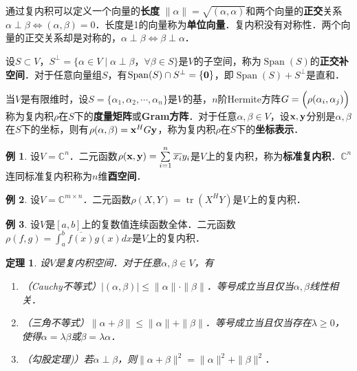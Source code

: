 \documentclass[a4paper,fontset=windows]{ctexbook}
\newtheorem{theorem}{定理}[chapter]
\theoremstyle{definition}
\newtheorem{example}{例}[chapter]
\DeclareMathOperator{\Span}{Span}
\DeclareMathOperator{\tr}{tr}
\renewcommand{\le}{\leqslant}
\renewcommand{\ge}{\geqslant}
\begin{document}
通过复内积可以定义一个向量的{\bf 长度} $\|\alpha\|=\sqrt{(\alpha,\alpha)}$和两个向量的{\bf 正交}关系$\alpha\perp\beta\Leftrightarrow(\alpha,\beta)=0$．长度是1的向量称为{\bf 单位向量}．复内积没有对称性．两个向量的正交关系却是对称的，$\alpha\perp\beta\Leftrightarrow\beta\perp\alpha$．

设$S\subset V$，$S^\perp=\{\alpha\in V\mid\alpha\perp\beta$，$\forall\beta\in S\}$是$V$的子空间，称为$\Span(S)$的{\bf 正交补空间}．对于任意向量组$S$，有$\Span(S)\cap S^\perp=\{{\bf 0}\}$，即$\Span(S)+S^\perp$是直和．

当$V$是有限维时，设$S=\{\alpha_1,\alpha_2,\cdots,\alpha_n\}$是$V$的基，$n$阶Hermite方阵$G=\Bigl(\rho(\alpha_i,\alpha_j)\Bigr)$称为复内积$\rho$在$S$下的{\bf 度量矩阵}或{\bf Gram方阵}．对于任意$\alpha,\beta\in V$，设${\bf x,y}$分别是$\alpha,\beta$在$S$下的坐标，则有$\rho(\alpha,\beta)={\bf x}^HG{\bf y}$，称为复内积$\rho$在$S$下的{\bf 坐标表示}．

\begin{example}
设$V=\mathbb{C}^n$．二元函数$\rho({\bf x,y})=\sum\limits_{i=1}^n\overline{x_i}y_i$是$V$上的复内积，称为{\bf 标准复内积}．$\mathbb{C}^n$连同标准复内积称为$n$维{\bf 酉空间}．
\end{example}

\begin{example}
设$V=\mathbb{C}^{m\times n}$．二元函数$\rho(X,Y)=\tr(X^HY)$是$V$上的复内积．
\end{example}

\begin{example}
设$V$是$[a,b]$上的复数值连续函数全体．二元函数$\rho(f,g)=\int_a^b\overline{f(x)}g(x)dx$是$V$上的复内积．
\end{example}

\begin{theorem}
设$V$是复内积空间．对于任意$\alpha,\beta\in V$，有
\begin{enumerate}
\item（{\rm Cauchy不等式}）$|(\alpha,\beta)|\le\|\alpha\|\cdot\|\beta\|$．等号成立当且仅当$\alpha,\beta$线性相关．

\item（{\rm 三角不等式}）$\|\alpha+\beta\|\le\|\alpha\|+\|\beta\|$．等号成立当且仅当存在$\lambda\ge 0$，使得$\alpha=\lambda\beta$或$\beta=\lambda\alpha$．

\item（{\rm 勾股定理)}）若$\alpha\perp\beta$，则$\|\alpha+\beta\|^2=\|\alpha\|^2+\|\beta\|^2$．
\end{enumerate}
\end{theorem}
\end{document}
